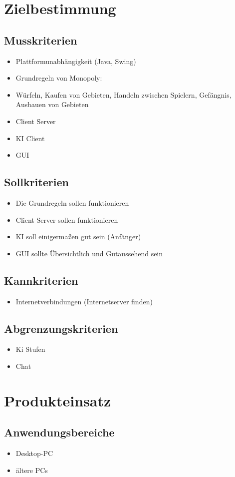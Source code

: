 \documentclass[a4paper,10pt]{article}
\begin{document}
\section{Zielbestimmung}
\subsection{Musskriterien}
\begin{itemize}
\item Plattformunabhängigkeit (Java, Swing)
\item Grundregeln von Monopoly:
\item Würfeln, Kaufen von Gebieten, Handeln zwischen Spielern, Gefängnis, Ausbauen von Gebieten
\item Client Server
\item KI Client
\item GUI
\end{itemize}
\subsection{Sollkriterien}
\begin{itemize}
\item Die Grundregeln sollen funktionieren
\item Client Server sollen funktionieren
\item KI soll einigermaßen gut sein (Anfänger)
\item GUI sollte Übersichtlich und Gutaussehend sein
\end{itemize}
\subsection{Kannkriterien}
\begin{itemize}
\item Internetverbindungen (Internetserver finden)
\end{itemize}
\subsection{Abgrenzungskriterien}
\begin{itemize}
\item Ki Stufen
\item Chat
\end{itemize}
\section{Produkteinsatz}
\subsection{Anwendungsbereiche}
\begin{itemize}
\item Desktop-PC
\item ältere PCs
\end{itemize}
\end{document}
